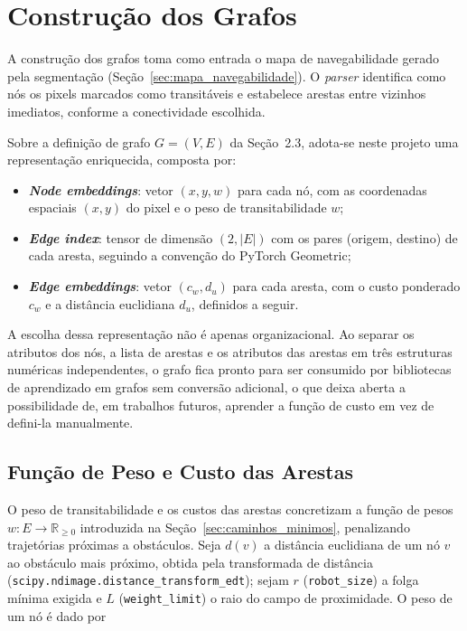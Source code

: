 \documentclass[
    12pt,
    openright,
    oneside,
    a4paper,
    english,
    brazil
]{abntex2}
\begin{document}
\section{Construção dos Grafos}
\label{sec:construcao_grafos}

A construção dos grafos toma como entrada o mapa de navegabilidade gerado pela segmentação (Seção~\ref{sec:mapa_navegabilidade}). O \textit{parser} identifica como nós os pixels marcados como transitáveis e estabelece arestas entre vizinhos imediatos, conforme a conectividade escolhida.

Sobre a definição de grafo $G = (V, E)$ da Seção~2.3, adota-se neste projeto uma representação enriquecida, composta por:

\begin{itemize}
    \item \textbf{\textit{Node embeddings}}: vetor $(x, y, w)$ para cada nó, com as coordenadas espaciais $(x, y)$ do pixel e o peso de transitabilidade $w$;
    \item \textbf{\textit{Edge index}}: tensor de dimensão $(2, |E|)$ com os pares (origem, destino) de cada aresta, seguindo a convenção do PyTorch Geometric;
    \item \textbf{\textit{Edge embeddings}}: vetor $(c_w, d_u)$ para cada aresta, com o custo ponderado $c_w$ e a distância euclidiana $d_u$, definidos a seguir.
\end{itemize}

A escolha dessa representação não é apenas organizacional. Ao separar os atributos dos nós, a lista de arestas e os atributos das arestas em três estruturas numéricas independentes, o grafo fica pronto para ser consumido por bibliotecas de aprendizado em grafos sem conversão adicional, o que deixa aberta a possibilidade de, em trabalhos futuros, aprender a função de custo em vez de defini-la manualmente.

\subsection{Função de Peso e Custo das Arestas}

O peso de transitabilidade e os custos das arestas concretizam a função de pesos $w : E \to \mathbb{R}_{\geq 0}$ introduzida na Seção~\ref{sec:caminhos_minimos}, penalizando trajetórias próximas a obstáculos. Seja $d(v)$ a distância euclidiana de um nó $v$ ao obstáculo mais próximo, obtida pela transformada de distância (\texttt{scipy.ndimage.distance\_transform\_edt}); sejam $r$ (\texttt{robot\_size}) a folga mínima exigida e $L$ (\texttt{weight\_limit}) o raio do campo de proximidade. O peso de um nó é dado por
\end{document}
